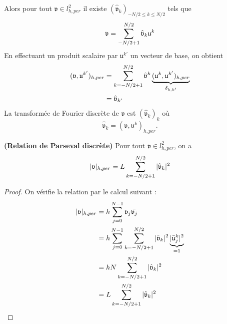 Alors pour tout $\mathfrak{v} \in l^2_{h,per}$ il existe $(\hat{\mathfrak{v}}_k )_{-N/2 \leq k \leq N/2}$ tels que 
\begin{equation}
\mathfrak{v} = \displaystyle\sum\limits_{-N/2+1}^{N/2} \hat{\mathfrak{v}}_k \mathfrak{u}^k
\end{equation}
En effectuant un produit scalaire par $\mathfrak{u}^{k'}$ un vecteur de base, on obtient
\begin{align*}
(\mathfrak{v}, \mathfrak{u}^{k'})_{h,per} & = \displaystyle\sum\limits_{k=-N/2+1}^{N/2} \hat{\mathfrak{v}}^k \underbrace{(\mathfrak{u}^k, \mathfrak{u}^{k'})_{h,per}}_{\delta_{k,k'}} \\
		& = \hat{\mathfrak{v}}_{k'}
\end{align*}
La transformée de Fourier discrète de $\mathfrak{v}$ est $(\hat{\mathfrak{v}}_{k})_k$ où
\begin{equation}
\hat{\mathfrak{v}}_{k} = (\mathfrak{v}, \mathfrak{u}^{k})_{h,per}.
\end{equation}

\begin{proposition}
\textbf{(Relation de Parseval discrète)} 
Pour tout $\mathfrak{v} \in l^2_{h,per}$, on a 
\begin{equation}
|\mathfrak{v}|_{h,per} = L \displaystyle\sum\limits_{k=-N/2+1}^{N/2} |\hat{\mathfrak{v}}_k|^2
\end{equation}
\end{proposition}

\begin{proof}
On vérifie la relation par le calcul suivant :
\begin{align*}
|\mathfrak{v}|_{h,per} & = h \displaystyle\sum\limits_{j=0}^{N-1} \mathfrak{v}_j \bar{\mathfrak{v}_j} \\
	& = h \displaystyle\sum\limits_{j=0}^{N-1} \displaystyle\sum\limits_{k=-N/2+1}^{N/2} |\hat{\mathfrak{v}}_k|^2 \underbrace{|\bar{\mathfrak{u}}_j^k|^2}_{=1}\\
	& = h N \displaystyle\sum\limits_{k=-N/2+1}^{N/2} |\hat{\mathfrak{v}}_k|^2 \\
	& = L \displaystyle\sum\limits_{k=-N/2+1}^{N/2} |\hat{\mathfrak{v}}_k|^2
\end{align*}
\end{proof}















